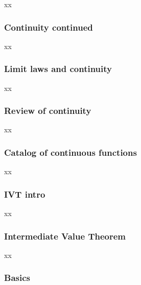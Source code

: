 \documentclass[pdftex, brazil, 12pt, twoside]{article}
\begin{document}
xx

\subsubsection{Continuity continued}
\label{u0-cont-continuity-continued}

xx

\subsubsection{Limit laws and continuity}
\label{u0-cont-laws}

xx

\subsubsection{Review of continuity}
\label{u0-cont-review}

xx

\subsubsection{Catalog of continuous functions}
\label{u0-cont-catalog}

xx

\subsubsection{IVT intro}
\label{u0-cont-ivt}

xx

\subsubsection{Intermediate Value Theorem}
\label{u0-cont-intermediate-value-theorem}

xx

\subsubsection{Basics}
\label{u0-cont-basics}
\end{document}
